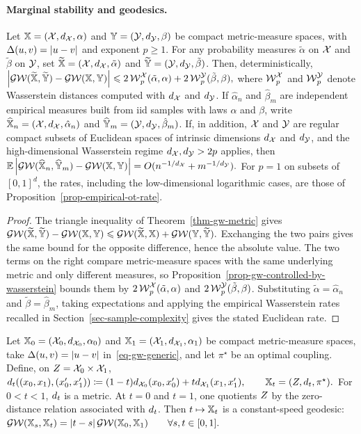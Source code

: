 \paragraph{Marginal stability and geodesics.}
\begin{prop}\label{prop-gw-empirical-stability}
Let $\mathbb{X}=(\mathcal{X},d_{\mathcal{X}},\alpha)$ and $\mathbb{Y}=(\mathcal{Y},d_{\mathcal{Y}},\beta)$ be compact metric-measure spaces, with $\Delta(u,v)=|u-v|$ and exponent $p\geq1$. For any probability measures $\tilde\alpha$ on $\mathcal{X}$ and $\tilde\beta$ on $\mathcal{Y}$, set
$\widetilde{\mathbb{X}}=(\mathcal{X},d_{\mathcal{X}},\tilde\alpha)$ and $\widetilde{\mathbb{Y}}=(\mathcal{Y},d_{\mathcal{Y}},\tilde\beta)$.
Then, deterministically, \(\left\lvert\operatorname{\mathcal{GW}}(\widetilde{\mathbb{X}},\widetilde{\mathbb{Y}})-\operatorname{\mathcal{GW}}(\mathbb{X},\mathbb{Y})\right\rvert \leqslant 2\operatorname{\mathcal{W}}_p^{\mathcal{X}}(\tilde\alpha,\alpha) + 2\operatorname{\mathcal{W}}_p^{\mathcal{Y}}(\tilde\beta,\beta),\)
where $\operatorname{\mathcal{W}}_p^{\mathcal{X}}$ and $\operatorname{\mathcal{W}}_p^{\mathcal{Y}}$ denote Wasserstein distances computed with $d_{\mathcal{X}}$ and $d_{\mathcal{Y}}$. If $\hat\alpha_n$ and $\hat\beta_m$ are independent empirical measures built from iid samples with laws $\alpha$ and $\beta$, write $\widehat{\mathbb{X}}_n=(\mathcal{X},d_{\mathcal{X}},\hat\alpha_n)$ and $\widehat{\mathbb{Y}}_m=(\mathcal{Y},d_{\mathcal{Y}},\hat\beta_m)$.
If, in addition, $\mathcal{X}$ and $\mathcal{Y}$ are regular compact subsets of Euclidean spaces of intrinsic dimensions $d_{\mathcal{X}}$ and $d_{\mathcal{Y}}$, and the high-dimensional Wasserstein regime $d_{\mathcal{X}},d_{\mathcal{Y}}>2p$ applies, then
\(\mathbb{E}\left\lvert\operatorname{\mathcal{GW}}(\widehat{\mathbb{X}}_n,\widehat{\mathbb{Y}}_m)-\operatorname{\mathcal{GW}}(\mathbb{X},\mathbb{Y})\right\rvert = O(n^{-1/d_{\mathcal{X}}}+m^{-1/d_{\mathcal{Y}}}).\)
For $p=1$ on subsets of $[0,1]^d$, the rates, including the low-dimensional logarithmic cases, are those of Proposition~\ref{prop-empirical-ot-rate}.
\end{prop}
\begin{proof}
The triangle inequality of Theorem~\ref{thm-gw-metric} gives \(\operatorname{\mathcal{GW}}(\widetilde{\mathbb{X}},\widetilde{\mathbb{Y}}) - \operatorname{\mathcal{GW}}(\mathbb{X},\mathbb{Y}) \leqslant \operatorname{\mathcal{GW}}(\widetilde{\mathbb{X}},\mathbb{X}) + \operatorname{\mathcal{GW}}(\mathbb{Y},\widetilde{\mathbb{Y}}).\)
Exchanging the two pairs gives the same bound for the opposite difference, hence the absolute value. The two terms on the right compare metric-measure spaces with the same underlying metric and only different measures, so Proposition~\ref{prop-gw-controlled-by-wasserstein} bounds them by $2\operatorname{\mathcal{W}}_p^{\mathcal{X}}(\tilde\alpha,\alpha)$ and $2\operatorname{\mathcal{W}}_p^{\mathcal{Y}}(\tilde\beta,\beta)$. Substituting $\tilde\alpha=\hat\alpha_n$ and $\tilde\beta=\hat\beta_m$, taking expectations and applying the empirical Wasserstein rates recalled in Section~\ref{sec-sample-complexity} gives the stated Euclidean rate.
\end{proof}
\begin{prop}\label{prop-gw-geodesics}
Let $\mathbb{X}_0=(\mathcal{X}_0,d_{\mathcal{X}_0},\alpha_0)$ and $\mathbb{X}_1=(\mathcal{X}_1,d_{\mathcal{X}_1},\alpha_1)$ be compact metric-measure spaces, take $\Delta(u,v)=|u-v|$ in~\eqref{eq-gw-generic}, and let $\pi^\star$ be an optimal coupling. Define, on $Z=\mathcal{X}_0\times\mathcal{X}_1$,
\(d_t((x_0,x_1),(x'_0,x'_1)) \coloneqq (1-t)d_{\mathcal{X}_0}(x_0,x'_0)+td_{\mathcal{X}_1}(x_1,x'_1), \qquad \mathbb{X}_t=(Z,d_t,\pi^\star).\)
For $0<t<1$, $d_t$ is a metric. At $t=0$ and $t=1$, one quotients $Z$ by the zero-distance relation associated with $d_t$. Then $t\mapsto\mathbb{X}_t$ is a constant-speed geodesic:
\(\operatorname{\mathcal{GW}}(\mathbb{X}_s,\mathbb{X}_t)=|t-s|\operatorname{\mathcal{GW}}(\mathbb{X}_0,\mathbb{X}_1) \qquad \forall s,t\in[0,1].\)
\end{prop}
